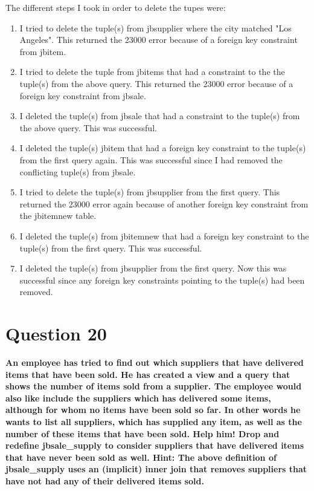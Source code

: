 \documentclass{article}
\begin{document}
The different steps I took in order to delete the tupes were:
\begin{enumerate}
	\item I tried to delete the tuple(s) from jbsupplier where the city matched "Los Angeles". This returned the 23000 error because of a foreign key constraint from jbitem.
	\item I tried to delete the tuple from jbitems that had a constraint to the the tuple(s) from the above query. This returned the 23000 error because of a foreign key constraint from jbsale.
	\item I deleted the tuple(s) from jbsale that had a constraint to the tuple(s) from the above query. This was successful.
	\item I deleted the tuple(s) jbitem that had a foreign key constraint to the tuple(s) from the first query again. This was successful since I had removed the conflicting tuple(s) from jbsale.
	\item I tried to delete the tuple(s) from jbsupplier from the first query. This returned the 23000 error again because of another foreign key constraint from the jbitemnew table.
	\item I deleted the tuple(s) from jbitemnew that had a foreign key constraint to the tuple(s) from the first query. This was successful.
	\item I deleted the tuple(s) from jbsupplier from the first query. Now this was successful since any foreign key constraints pointing to the tuple(s) had been removed.
\end{enumerate}

\section*{Question 20}
\textbf{An employee has tried to find out which suppliers that have delivered items that
have been sold. He has created a view and a query that shows the number of items
sold from a supplier. The employee would also like include the suppliers which has delivered some items, although for whom no items have been sold so far. In other words he wants to list all suppliers, which has supplied any item, as well as the number of these items that have been sold. Help him! Drop and redefine jbsale\_supply to consider suppliers that have delivered items that have never been sold as well. Hint: The above definition of jbsale\_supply uses an (implicit) inner join that removes suppliers that have not had any of their delivered items sold.}
\end{document}

